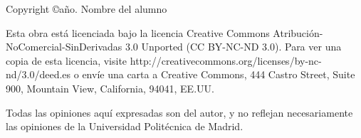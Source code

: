 \begin{flushleft}

Copyright \copyright  año. Nombre del alumno


Esta obra está licenciada bajo la licencia Creative Commons Atribución-NoComercial-SinDerivadas 3.0 Unported (CC BY-NC-ND 3.0). Para ver una copia de esta licencia, visite http://creativecommons.org/licenses/by-nc-nd/3.0/deed.es o envíe una carta a Creative Commons, 444 Castro Street, Suite 900, Mountain View, California, 94041, EE.UU.

Todas las opiniones aquí expresadas son del autor, y no reflejan necesariamente las opiniones
de la Universidad Politécnica de Madrid.

\end{flushleft}